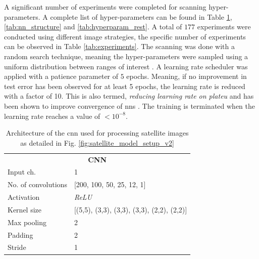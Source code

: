 A significant number of experiments were completed for scanning hyper-parameters. A complete list of hyper-parameters can be found in Table \ref{tab:cnn_structure}, \ref{tab:nn_structure} and \ref{tab:hyperparam_rest}. A total of $177$ experiments were conducted using different image strategies, the specific number of experiments can be observed in Table \ref{tab:experiments}. The scanning was done with  a random search technique, meaning the hyper-parameters were sampled using a uniform distribution between ranges of interest \cite{Bergstra2012RandomOptimization}. A learning rate scheduler was applied with a patience parameter of $5$ epochs. Meaning, if no improvement in test error has been observed for at least 5 epochs, the learning rate is reduced with a factor of 10. This is also termed, \emph{reducing learning rate on plateu} and has been shown to improve convergence of \glspl{nn} \cite{SmithSuper-Convergence:Rates}. The training is terminated when the learning rate reaches a value of $< 10^{-8}$.

\def\arraystretch{1.5}
\begin{table}[]
\begin{center}
\begin{tabular}{ll}
\multicolumn{2}{c}{\textbf{CNN}}                                                       \\
\multicolumn{1}{l|}{Input ch.}           & 1                                          \\ \hline
\multicolumn{1}{l|}{No. of convolutions} & [200, 100, 50, 25, 12, 1]                  \\ \hline
\multicolumn{1}{l|}{Activation}          & \emph{ReLU}                                       \\ \hline
\multicolumn{1}{l|}{Kernel size}         & [(5,5), (3,3), (3,3), (3,3), (2,2), (2,2)] \\ \hline
\multicolumn{1}{l|}{Max pooling}         & 2                                          \\ \hline
\multicolumn{1}{l|}{Padding}             & 2                                          \\ \hline
\multicolumn{1}{l|}{Stride}              & 1                                         
\end{tabular}
\end{center}
\caption{Architecture of the \gls{cnn} used for processing satellite images as detailed in Fig. \ref{fig:satellite_model_setup_v2}}\label{tab:cnn_structure}
\end{table}




